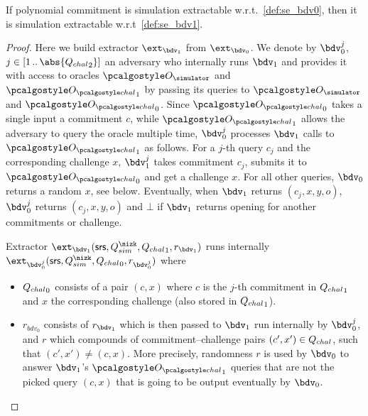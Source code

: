 \documentclass[runningheads,11pt]{llncs}
\begin{document}
\begin{lemma}[]
  If polynomial commitment is simulation extractable w.r.t.~\cref{def:se_bdv0}, then
  it is simulation extractable w.r.t~\cref{def:se_bdv1}.
\end{lemma}
\begin{proof}
  Here we build extractor $\ext_{\bdv_1}$ from $\ext_{\bdv_0}$. We denote by
  $\bdv_0^{j}$, $j \in \range{1}{\abs{{\Qchal}_2}}$ an adversary who internally runs
  $\bdv_1$ and provides it with access to oracles $\oracles$ and $\oraclec_1$ by
  passing its queries to $\oracles$ and $\oraclec_0$. Since $\oraclec_0$ takes a
  single input a commitment $c$, while $\oraclec_1$ allows the adversary to query the
  oracle multiple time, $\bdv_0^{j}$ processes $\bdv_1$ calls to $\oraclec_1$ as
  follows. For a $j$-th query $c_j$ and the corresponding challenge $x$, $\bdv_1^{j}$
  takes commitment $c_j$, submits it to $\oraclec_0$ and get a challenge $x$. For all
  other queries, $\bdv_0$ returns a random $x$, see below. Eventually, when $\bdv_1$ returns
  $(c_j, x, y, o)$, $\bdv_0^{j}$ returns $(c_j, x, y, o)$ and $\bot$ if $\bdv_1$
  returns opening for another commitments or challenge.

  Extractor $\ext_{\bdv_1} (\srs, \Qsim, {\Qchal}_1, r_{\bdv_1})$ runs internally
  $\ext_{\bdv_0^j} (\srs, \Qsim, \Qchal_0, r_{\bdv_0^j})$ where
  \begin{itemize}
  \item ${Q_{chal}}_0$ consists of a pair $(c, x)$ where $c$ is the $j$-th commitment in
    ${Q_{chal}}_1$ and $x$ the corresponding challenge (also stored in ${Q_{chal}}_1$).
  \item $r_{bdv_0}$ consists of $r_{\bdv_1}$ which is then passed to $\bdv_1$ run
    internally by $\bdv_0^j$, and $r$ which compounds of commitment--challenge pairs
    $(c', x') \in {Q_{chal}}$, such that $(c', x') \neq (c, x)$. More precisely,
    randomness $r$ is used by $\bdv_0$ to answer $\bdv_1$'s $\oraclec_1$ queries that
    are not the picked query $(c, x)$ that is going to be output eventually by $\bdv_0$. 
  \end{itemize}
\end{proof}
\end{document}
